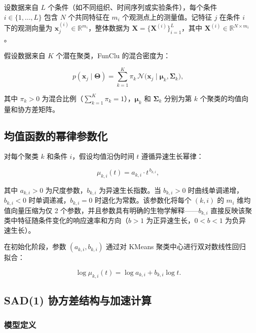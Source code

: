 \documentclass[12pt,a4paper]{article}
\begin{document}
设数据来自 $L$ 个条件（如不同组织、时间序列或实验条件），每个条件 $i \in \{1, \dots, L\}$ 包含 $N$ 个共同特征在 $m_i$ 个观测点上的测量值。记特征 $j$ 在条件 $i$ 下的观测向量为 $\bm{x}_j^{(i)} \in \mathbb{R}^{m_i}$，整体数据为 $\bm{X} = \{\bm{X}^{(i)}\}_{i=1}^{L}$，其中 $\bm{X}^{(i)} \in \mathbb{R}^{N \times m_i}$。

假设数据来自 $K$ 个潜在聚类，FunClu 的混合密度为：

\begin{equation}\label{eq:mixture}
    p(\bm{x}_j \mid \bm{\Theta}) = \sum_{k=1}^{K} \pi_k \,
        \mathcal{N}\bigl(\bm{x}_j \mid \bm{\mu}_k, \bm{\Sigma}_k\bigr),
\end{equation}

其中 $\pi_k > 0$ 为混合比例（$\sum_{k=1}^{K} \pi_k = 1$），$\bm{\mu}_k$ 和 $\bm{\Sigma}_k$ 分别为第 $k$ 个聚类的均值向量和协方差矩阵。

\subsection{均值函数的幂律参数化}

对每个聚类 $k$ 和条件 $i$，假设均值沿伪时间 $t$ 遵循异速生长幂律：

\begin{equation}\label{eq:power_mean}
    \mu_{k,i}(t) = a_{k,i} \cdot t^{\,b_{k,i}},
\end{equation}

其中 $a_{k,i} > 0$ 为尺度参数，$b_{k,i}$ 为异速生长指数。当 $b_{k,i} > 0$ 时曲线单调递增，$b_{k,i} < 0$ 时单调递减，$b_{k,i} = 0$ 时退化为常数。该参数化将每个 $(k,i)$ 的 $m_i$ 维均值向量压缩为仅 2 个参数，并且参数具有明确的生物学解释——$b_{k,i}$ 直接反映该聚类中特征随条件变化的响应速率和方向（$b > 1$ 为正异速生长，$0 < b < 1$ 为负异速生长）。

在初始化阶段，参数 $(a_{k,i}, b_{k,i})$ 通过对 KMeans 聚类中心进行双对数线性回归拟合：

\begin{equation}\label{eq:loglinear_init}
    \log \mu_{k,i}(t) = \log a_{k,i} + b_{k,i} \log t.
\end{equation}

\subsection{SAD(1) 协方差结构与加速计算}

\subsubsection{模型定义}
\end{document}
